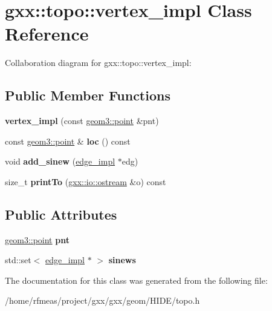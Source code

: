 \hypertarget{classgxx_1_1topo_1_1vertex__impl}{}\section{gxx\+:\+:topo\+:\+:vertex\+\_\+impl Class Reference}
\label{classgxx_1_1topo_1_1vertex__impl}


Collaboration diagram for gxx\+:\+:topo\+:\+:vertex\+\_\+impl\+:
\subsection*{Public Member Functions}
\begin{DoxyCompactItemize}
\item 
{\bfseries vertex\+\_\+impl} (const \hyperlink{classgxx_1_1geom3_1_1point}{geom3\+::point} \&pnt)\hypertarget{classgxx_1_1topo_1_1vertex__impl_a21b2305b46b7d1dcf018a2dc7ffd120c}{}\label{classgxx_1_1topo_1_1vertex__impl_a21b2305b46b7d1dcf018a2dc7ffd120c}

\item 
const \hyperlink{classgxx_1_1geom3_1_1point}{geom3\+::point} \& {\bfseries loc} () const \hypertarget{classgxx_1_1topo_1_1vertex__impl_a6a59a410b02a6a79b592e56eabf4e9ea}{}\label{classgxx_1_1topo_1_1vertex__impl_a6a59a410b02a6a79b592e56eabf4e9ea}

\item 
void {\bfseries add\+\_\+sinew} (\hyperlink{classgxx_1_1topo_1_1edge__impl}{edge\+\_\+impl} $\ast$edg)\hypertarget{classgxx_1_1topo_1_1vertex__impl_aeccd136a094dfd8cb83ae5f06eac6606}{}\label{classgxx_1_1topo_1_1vertex__impl_aeccd136a094dfd8cb83ae5f06eac6606}

\item 
size\+\_\+t {\bfseries print\+To} (\hyperlink{classgxx_1_1io_1_1ostream}{gxx\+::io\+::ostream} \&o) const \hypertarget{classgxx_1_1topo_1_1vertex__impl_adb9985e2af8b3f3b3405c066faf927f3}{}\label{classgxx_1_1topo_1_1vertex__impl_adb9985e2af8b3f3b3405c066faf927f3}

\end{DoxyCompactItemize}
\subsection*{Public Attributes}
\begin{DoxyCompactItemize}
\item 
\hyperlink{classgxx_1_1geom3_1_1point}{geom3\+::point} {\bfseries pnt}\hypertarget{classgxx_1_1topo_1_1vertex__impl_ac9ddff914615016eb164408d34ddf180}{}\label{classgxx_1_1topo_1_1vertex__impl_ac9ddff914615016eb164408d34ddf180}

\item 
std\+::set$<$ \hyperlink{classgxx_1_1topo_1_1edge__impl}{edge\+\_\+impl} $\ast$ $>$ {\bfseries sinews}\hypertarget{classgxx_1_1topo_1_1vertex__impl_a95c9ca3ac833dc98ea4caf5667557a86}{}\label{classgxx_1_1topo_1_1vertex__impl_a95c9ca3ac833dc98ea4caf5667557a86}

\end{DoxyCompactItemize}


The documentation for this class was generated from the following file\+:\begin{DoxyCompactItemize}
\item 
/home/rfmeas/project/gxx/gxx/geom/\+H\+I\+D\+E/topo.\+h\end{DoxyCompactItemize}
